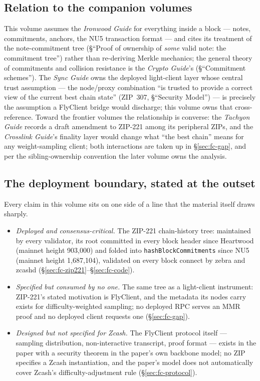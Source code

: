 \documentclass[11pt,a4paper]{article}
\theoremstyle{definition}
\begin{document}
\subsection{Relation to the companion volumes}\label{sec:fc-siblings}

This volume assumes the \emph{Ironwood Guide} for everything inside a block
--- notes, commitments, anchors, the NU5 transaction format --- and cites its
treatment of the note-commitment tree (\S``Proof of ownership of \emph{some}
valid note: the commitment tree'') rather than re-deriving Merkle mechanics;
the general theory of commitments and collision resistance is the
\emph{Crypto Guide}'s (\S``Commitment schemes''). The \emph{Sync Guide} owns
the deployed light-client layer whose central trust assumption --- the
node/proxy combination ``is trusted to provide a correct view of the current
best chain state'' (ZIP~307, \S``Security Model'') --- is precisely the
assumption a FlyClient bridge would discharge; this volume owns that
cross-reference. Toward the
frontier volumes the relationship is converse: the \emph{Tachyon Guide}
records a draft amendment to ZIP-221 among its peripheral ZIPs, and the
\emph{Crosslink Guide}'s finality layer would change what ``the best chain''
means for any weight-sampling client; both interactions are taken up in
\S\ref{sec:fc-gap}, and per the sibling-ownership convention the later
volume owns the analysis.

\subsection{The deployment boundary, stated at the outset}
\label{sec:fc-boundary}

Every claim in this volume sits on one side of a line that the material
itself draws sharply.

\begin{itemize}[leftmargin=1.4em]
\item \emph{Deployed and consensus-critical.} The ZIP-221 chain-history
tree: maintained by every validator, its root committed in every block
header since Heartwood (mainnet height 903{,}000) and folded into
\texttt{hashBlockCommitments} since NU5 (mainnet height 1{,}687{,}104),
validated on every block connect by \textsf{zebra} and \textsf{zcashd}
(\S\ref{sec:fc-zip221}--\S\ref{sec:fc-code}).
\item \emph{Specified but consumed by no one.} The same tree as a
light-client instrument: ZIP-221's stated motivation is FlyClient, and the
metadata its nodes carry exists for difficulty-weighted sampling; no
deployed RPC serves an MMR proof and no deployed client requests one
(\S\ref{sec:fc-gap}).
\item \emph{Designed but not specified for Zcash.} The FlyClient protocol
itself --- sampling distribution, non-interactive transcript, proof format
--- exists in the paper with a security theorem in the paper's own backbone
model; no ZIP specifies a Zcash instantiation, and the paper's model does
not automatically cover Zcash's difficulty-adjustment rule
(\S\ref{sec:fc-protocol}).
\end{itemize}
\end{document}
